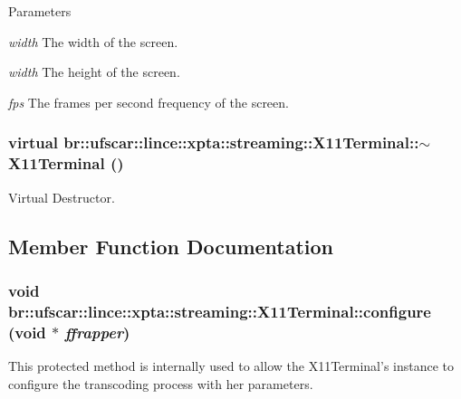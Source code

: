 \begin{DoxyParams}{Parameters}
\item[{\em width}]The width of the screen. \item[{\em width}]The height of the screen. \item[{\em fps}]The frames per second frequency of the screen. \end{DoxyParams}
\hypertarget{classbr_1_1ufscar_1_1lince_1_1xpta_1_1streaming_1_1X11Terminal_aa16b9c8205c9805186b6b9842e663be8}{
\subsubsection[{$\sim$X11Terminal}]{\setlength{\rightskip}{0pt plus 5cm}virtual br::ufscar::lince::xpta::streaming::X11Terminal::$\sim$X11Terminal ()}}
\label{classbr_1_1ufscar_1_1lince_1_1xpta_1_1streaming_1_1X11Terminal_aa16b9c8205c9805186b6b9842e663be8}


Virtual Destructor. 



\subsection{Member Function Documentation}
\hypertarget{classbr_1_1ufscar_1_1lince_1_1xpta_1_1streaming_1_1X11Terminal_af41a852e18a8d9fa64202eb12f2dfb12}{
\subsubsection[{configure}]{\setlength{\rightskip}{0pt plus 5cm}void br::ufscar::lince::xpta::streaming::X11Terminal::configure (void $\ast$ {\em ffrapper})}}
\label{classbr_1_1ufscar_1_1lince_1_1xpta_1_1streaming_1_1X11Terminal_af41a852e18a8d9fa64202eb12f2dfb12}


This protected method is internally used to allow the X11Terminal's instance to configure the transcoding process with her parameters. 


